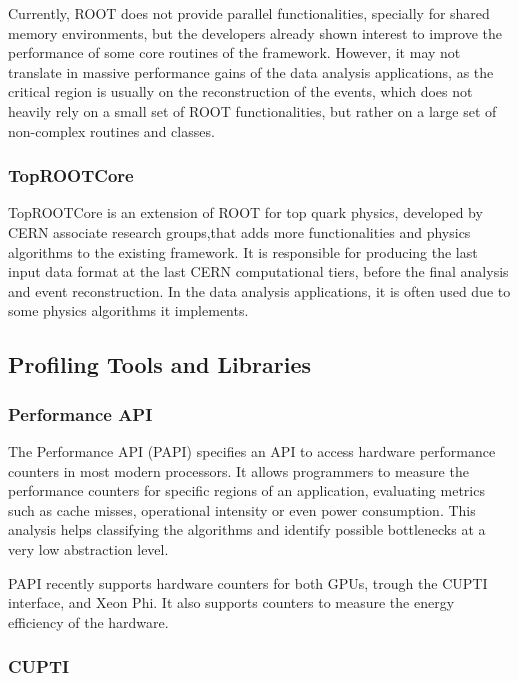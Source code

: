 Currently, ROOT does not provide parallel functionalities, specially for shared memory environments, but the developers already shown interest to improve the performance of some core routines of the framework. However, it may not translate in massive performance gains of the data analysis applications, as the critical region is usually on the reconstruction of the events, which does not heavily rely on a small set of ROOT functionalities, but rather on a large set of non-complex routines and classes.

\subsubsection*{TopROOTCore}

TopROOTCore is an extension of ROOT for top quark physics, developed by CERN associate research groups,that adds more functionalities and physics algorithms to the existing framework. It is responsible for producing the last input data format at the last CERN computational tiers, before the final analysis and event reconstruction. In the data analysis applications, it is often used due to some physics algorithms it implements.

\subsection{Profiling Tools and Libraries}
\label{tools}

\subsubsection*{Performance API}

The Performance API (PAPI) \cite{PAPI} specifies an API to access hardware performance counters in most modern processors. It allows programmers to measure the performance counters for specific regions of an application, evaluating metrics such as cache misses, operational intensity or even power consumption. This analysis helps classifying the algorithms and identify possible bottlenecks at a very low abstraction level.

PAPI recently supports hardware counters for both \nvidia GPUs, trough the \nvidia CUPTI interface, and \intel Xeon Phi. It also supports counters to measure the energy efficiency of the hardware.

\subsubsection*{\nvidia CUPTI}


